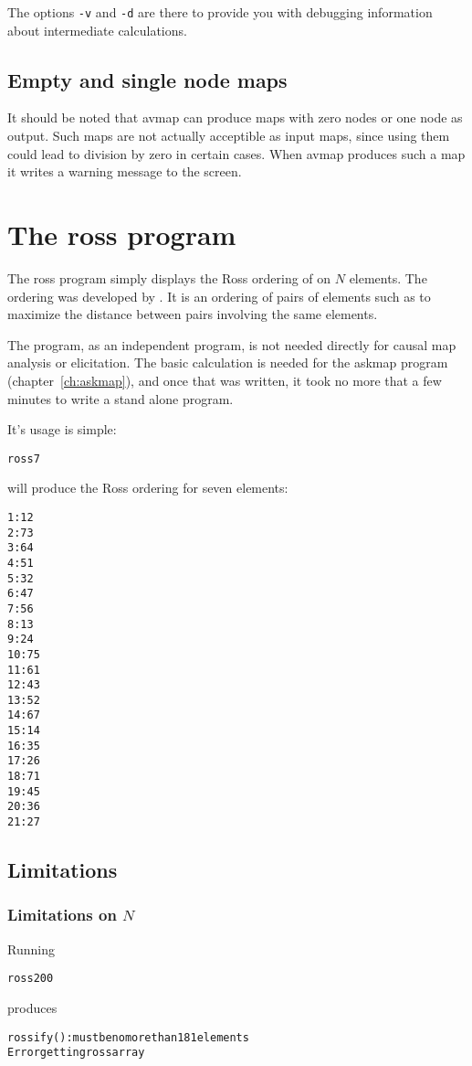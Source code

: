 \documentclass[%
	11pt,
        a4paper,
        twoside]{workrep}
\newcommand*{\prg}[1]{\textsf{#1}}		%
\newcommand*{\opt}[1]{\texttt{#1}}		%
\begin{document}
The options \opt{-v} and \opt{-d} are there to provide
you with debugging information about intermediate calculations.

\section{Empty and single node maps}\label{sec:avmap:empty}

It should be noted that \prg{avmap} can produce maps with
zero nodes or one node as output.  Such maps are not actually
acceptible as input maps, since using them could lead to division
by zero in certain cases.  When \prg{avmap} produces such a map
it writes a warning message to the screen.

\chapter{The \prg{ross} program}\label{ch:ross}

The \prg{ross} program simply displays the Ross ordering of on $N$
elements.  The ordering was developed by .  It is
an ordering of pairs of elements such as to maximize the distance
between pairs involving the same elements.

The program, as an independent program, is not needed directly for
causal map analysis or elicitation.  The basic calculation is needed
for the \prg{askmap} program (chapter~\ref{ch:askmap}), and once that
was written, it took no more that a few minutes to write a stand
alone program.

It's usage is simple:
\begin{alltt}
 ross 7
\end{alltt}
will produce the Ross ordering for seven elements:
\begin{alltt}
1: 1 2
2: 7 3
3: 6 4
4: 5 1
5: 3 2
6: 4 7
7: 5 6
8: 1 3
9: 2 4
10: 7 5
11: 6 1
12: 4 3
13: 5 2
14: 6 7
15: 1 4
16: 3 5
17: 2 6
18: 7 1
19: 4 5
20: 3 6
21: 2 7
\end{alltt}

\section{Limitations}

\subsection{Limitations on $N$}

Running
\begin{alltt}
 ross 200
\end{alltt}
produces
\begin{alltt}
rossify(): must be no more than 181 elements
Error getting ross array
\end{alltt}
\end{document}
